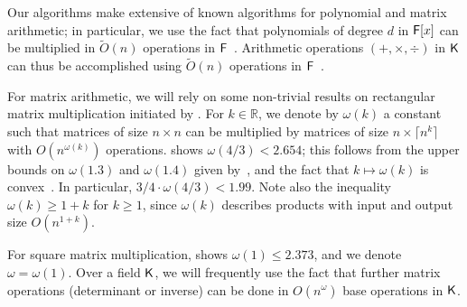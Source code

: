 Our algorithms make extensive of known algorithms for polynomial and matrix
arithmetic; in particular, we use the fact that polynomials of degree $d$
in ${\mathsf{F}}[x]$ can be multiplied in $\tilde{O}(n)$ operations in
${\mathsf{F}}$~\cite{ScSt71}. Arithmetic operations $(+,\times,\div)$ in ${\mathsf{K}}$ can
thus be accomplished using $\tilde{O}(n)$ operations in
${\mathsf{F}}$~\cite{vzGathen13}.

For matrix arithmetic, we will rely on some non-trivial results on
rectangular matrix multiplication initiated by . For
$k \in \mathbb{R}$, we denote by $\omega(k)$ a constant such that matrices
of size $n\times n$ can be multiplied by matrices of size
$n\times \lceil n^k \rceil$ with $O(n^{\omega(k)})$ operations. 
\cite{LeGall} shows $\omega(4/3) < 2.654$; this follows from the
upper bounds on $\omega(1.3)$ and $\omega(1.4)$ given by~,
and the fact that $k \mapsto \omega(k)$ is convex~\cite{LoRo83}. In
particular, $3/4 \cdot \omega(4/3) < 1.99$. Note also the inequality
$\omega(k) \ge 1+k$ for $k\ge 1$, since $\omega(k)$ describes products with
input and output size $O(n^{1+k})$.

For square matrix multiplication, \cite{LeGall14} shows
$\omega(1) \le 2.373$, and we denote $\omega=\omega(1)$.  Over a field
${\mathsf{K}}$, we will frequently use the fact that further matrix operations
(determinant or inverse) can be done in $O(n^\omega)$ base operations in
${\mathsf{K}}$.


